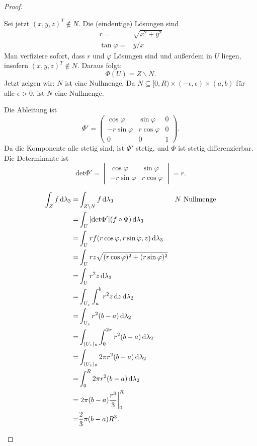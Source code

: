 \begin{proof}
\begin{parts}
		Sei jetzt $(x,y,z)^T\not\in N$. Die (eindeutige) Lösungen sind
		\begin{align*}
			r=&\sqrt{x^2+y^2} \\
			\tan\varphi=&y / x
		\end{align*}
		Man verfiziere sofort, dass $r$ und $\varphi$ Lösungen sind und außerdem in $U$ liegen, insofern $(x,y,z)^T\not\in N$. Daraus folgt:
		\[
		\Phi(U)=Z\backslash N
		.\] 
		Jetzt zeigen wir: $N$ ist eine Nullmenge. Da $N\subseteq [0,R)\times (-\epsilon,\epsilon)\times (a,b)$ f\"{u}r alle $\epsilon>0 $, ist $N$ eine Nullmenge.
\item Die Ableitung ist
	\[
		\Phi'=\begin{pmatrix} \cos\varphi & \sin\varphi & 0 \\ -r\sin\varphi & r\cos\varphi & 0 \\ 0 & 0 & 1 \end{pmatrix} 
	.\] 
	Da die Komponente alle stetig sind, ist $\Phi'$ stetig, und $\Phi$ ist stetig differenzierbar. Die Determinante ist
	\[
		\text{det}\Phi'=
		\begin{vmatrix}
			\cos\varphi & \sin\varphi \\ -r\sin\varphi & r\cos\varphi
		\end{vmatrix}=r
	.\] 
\item 
	\begin{align*}
		\int_Z f\dd{\lambda_3}=&\int_{Z\backslash N}f\dd{\lambda_3} & N\text{ Nullmenge}\\
		=&\int_U |\text{det}\Phi'|(f\circ\Phi)\dd{\lambda_3}\\
		=&\int_U rf(r\cos\varphi,r\sin\varphi,z)\dd{\lambda_3}\\
		=&\int_U rz\sqrt{(r\cos\varphi)^2+(r\sin\varphi)^2} \\
		=&\int_U r^2z\dd{\lambda_3}\\
		=&\int_{U_z}\int_a^b r^2z\dd{z}\dd{\lambda_2}\\
		=&\int_{U_z}r^2(b-a)\dd{\lambda_2}\\
		=&\int_{(U_z)_\theta}\int_0^{2\pi}r^2(b-a)\dd{\lambda_2}\\
		=&\int_{(U_z)_\theta}2\pi r^2(b-a)\dd{\lambda_2}\\
		=&\int_0^R 2\pi r^2(b-a)\dd{\lambda_2}\\
		=&\left.2\pi(b-a)\frac{r^3}{3}\right|_0^R\\
		=&\frac{2}{3}\pi(b-a)R^3.\qedhere
	\end{align*}
	\end{parts}
\end{proof}
